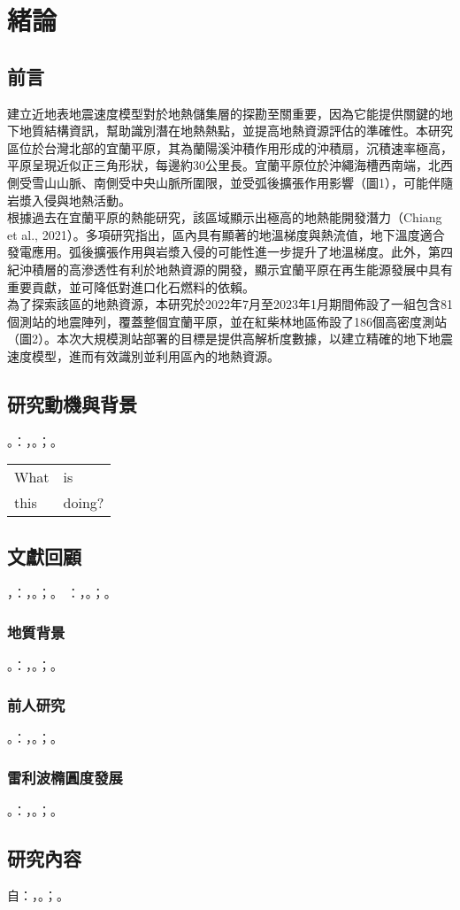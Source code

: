 
\chapter{緒論}

\section{前言}
\begingroup
\centering
建立近地表地震速度模型對於地熱儲集層的探勘至關重要，因為它能提供關鍵的地下地質結構資訊，幫助識別潛在地熱熱點，並提高地熱資源評估的準確性。本研究區位於台灣北部的宜蘭平原，其為蘭陽溪沖積作用形成的沖積扇，沉積速率極高，平原呈現近似正三角形狀，每邊約30公里長。宜蘭平原位於沖繩海槽西南端，北西側受雪山山脈、南側受中央山脈所圍限，並受弧後擴張作用影響（圖1），可能伴隨岩漿入侵與地熱活動。 \\
根據過去在宜蘭平原的熱能研究，該區域顯示出極高的地熱能開發潛力（Chiang et al., 2021）。多項研究指出，區內具有顯著的地溫梯度與熱流值，地下溫度適合發電應用。弧後擴張作用與岩漿入侵的可能性進一步提升了地溫梯度。此外，第四紀沖積層的高滲透性有利於地熱資源的開發，顯示宜蘭平原在再生能源發展中具有重要貢獻，並可降低對進口化石燃料的依賴。 \\
為了探索該區的地熱資源，本研究於2022年7月至2023年1月期間佈設了一組包含81個測站的地震陣列，覆蓋整個宜蘭平原，並在紅柴林地區佈設了186個高密度測站（圖2）。本次大規模測站部署的目標是提供高解析度數據，以建立精確的地下地震速度模型，進而有效識別並利用區內的地熱資源。

\captionsetup{type=figure}
\label{tbl:nicetablelesstable}
\endgroup


\section{研究動機與背景}

。：，。；。

\begin{tabular}{ll}
What & is \\
this & doing? \\
\end{tabular}

\section{文獻回顧}

，：，。；。
：，。；。\par

\subsection{地質背景}
。：，。；。
\subsection{前人研究}
。：，。；。
\subsection{雷利波橢圓度發展}
。：，。；。
\section{研究內容}

自：，。；。